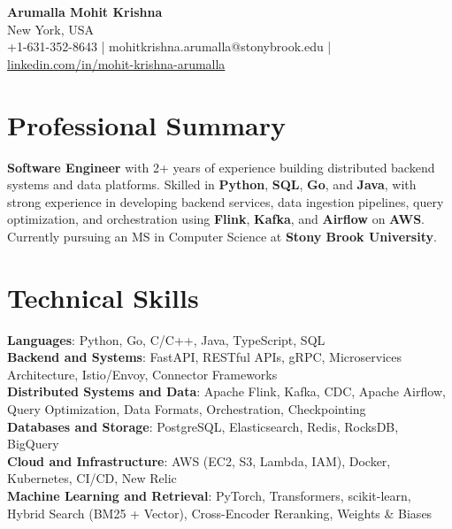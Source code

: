 \documentclass[letterpaper,11pt]{article}
\begin{document}
\begin{center}
  {\Large \textbf{Arumalla Mohit Krishna}} \\
  New York, USA \\
  +1-631-352-8643 \enspace | \enspace mohitkrishna.arumalla@stonybrook.edu \enspace | \enspace \href{https://www.linkedin.com/in/mohit-krishna-arumalla}{linkedin.com/in/mohit-krishna-arumalla}
\end{center}

\section{Professional Summary}
  \begin{itemize}[leftmargin=0.15in, label={}]
    \small{\item{
     \textbf{Software Engineer} with 2+ years of experience building distributed backend systems and data platforms. Skilled in \textbf{Python}, \textbf{SQL}, \textbf{Go}, and \textbf{Java}, with strong experience in developing backend services, data ingestion pipelines, query optimization, and orchestration using \textbf{Flink}, \textbf{Kafka}, and \textbf{Airflow} on \textbf{AWS}. Currently pursuing an MS in Computer Science at \textbf{Stony Brook University}.
    }}
  \end{itemize}
\vspace{-16pt}

\section{Technical Skills}
 \begin{itemize}[leftmargin=0.15in, label={}]
    \small{\item{
     \textbf{Languages}: Python, Go, C/C++, Java, TypeScript, SQL \\
     \textbf{Backend and Systems}: FastAPI, RESTful APIs, gRPC, Microservices Architecture, Istio/Envoy, Connector Frameworks \\
     \textbf{Distributed Systems and Data}: Apache Flink, Kafka, CDC, Apache Airflow, Query Optimization, Data Formats, Orchestration, Checkpointing \\
     \textbf{Databases and Storage}: PostgreSQL, Elasticsearch, Redis, RocksDB, BigQuery \\
     \textbf{Cloud and Infrastructure}: AWS (EC2, S3, Lambda, IAM), Docker, Kubernetes, CI/CD, New Relic \\
     \textbf{Machine Learning and Retrieval}: PyTorch, Transformers, scikit-learn, Hybrid Search (BM25 + Vector), Cross-Encoder Reranking, Weights \& Biases
    }}
 \end{itemize}
\vspace{-16pt}
\end{document}
